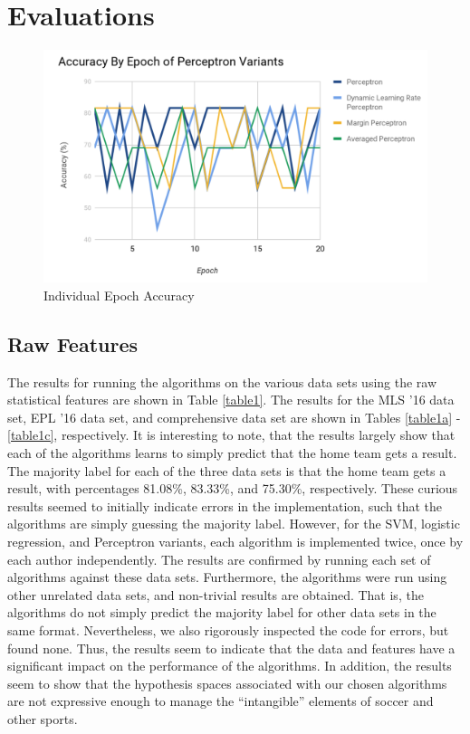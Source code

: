 \section{Evaluations}

\begin{figure}[t]
\includegraphics[width=12cm]{epoch.png}
\caption{Individual Epoch Accuracy}
\label{figure1}
\end{figure}

\subsection{Raw Features}
The results for running the algorithms on the various data sets using the raw statistical features are shown in Table \ref{table1}. The results for the MLS '16 data set, EPL '16 data set, and comprehensive data set are shown in Tables \ref{table1a} - \ref{table1c}, respectively. It is interesting to note, that the results largely show that each of the algorithms learns to simply predict that the home team gets a result. The majority label for each of the three data sets is that the home team gets a result, with percentages 81.08\%, 83.33\%, and 75.30\%, respectively. These curious results seemed to initially indicate errors in the implementation, such that the algorithms are simply guessing the majority label. However, for the SVM, logistic regression, and Perceptron variants, each algorithm is implemented twice, once by each author independently. The results are confirmed by running each set of algorithms against these data sets. Furthermore, the algorithms were run using other unrelated data sets, and non-trivial results are obtained. That is, the algorithms do not simply predict the majority label for other data sets in the same format. Nevertheless, we also rigorously inspected the code for errors, but found none. Thus, the results seem to indicate that the data and features have a significant impact on the performance of the algorithms. In addition, the results seem to show that the hypothesis spaces associated with our chosen algorithms are not expressive enough to manage the ``intangible'' elements of soccer and other sports.

